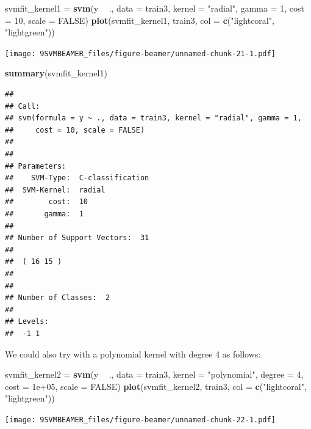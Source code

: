\documentclass[ignorenonframetext,]{beamer}
\newenvironment{Shaded}{\begin{snugshade}}{\end{snugshade}}
\newcommand{\KeywordTok}[1]{\textcolor[rgb]{0.13,0.29,0.53}{\textbf{#1}}}
\newcommand{\DataTypeTok}[1]{\textcolor[rgb]{0.13,0.29,0.53}{#1}}
\newcommand{\DecValTok}[1]{\textcolor[rgb]{0.00,0.00,0.81}{#1}}
\newcommand{\FloatTok}[1]{\textcolor[rgb]{0.00,0.00,0.81}{#1}}
\newcommand{\StringTok}[1]{\textcolor[rgb]{0.31,0.60,0.02}{#1}}
\newcommand{\OtherTok}[1]{\textcolor[rgb]{0.56,0.35,0.01}{#1}}
\newcommand{\OperatorTok}[1]{\textcolor[rgb]{0.81,0.36,0.00}{\textbf{#1}}}
\newcommand{\NormalTok}[1]{#1}
\begin{document}
\begin{frame}[fragile]

\begin{Shaded}
\begin{Highlighting}[]
\NormalTok{svmfit_kernel1 =}\StringTok{ }\KeywordTok{svm}\NormalTok{(y }\OperatorTok{~}\StringTok{ }\NormalTok{., }\DataTypeTok{data =}\NormalTok{ train3, }\DataTypeTok{kernel =} \StringTok{"radial"}\NormalTok{, }\DataTypeTok{gamma =} \DecValTok{1}\NormalTok{, }
    \DataTypeTok{cost =} \DecValTok{10}\NormalTok{, }\DataTypeTok{scale =} \OtherTok{FALSE}\NormalTok{)}
\KeywordTok{plot}\NormalTok{(svmfit_kernel1, train3, }\DataTypeTok{col =} \KeywordTok{c}\NormalTok{(}\StringTok{"lightcoral"}\NormalTok{, }\StringTok{"lightgreen"}\NormalTok{))}
\end{Highlighting}
\end{Shaded}

\texttt{[image: 9SVMBEAMER\_files/figure-beamer/unnamed-chunk-21-1.pdf]}

\begin{Shaded}
\begin{Highlighting}[]
\KeywordTok{summary}\NormalTok{(svmfit_kernel1)}
\end{Highlighting}
\end{Shaded}

\begin{verbatim}
## 
## Call:
## svm(formula = y ~ ., data = train3, kernel = "radial", gamma = 1, 
##     cost = 10, scale = FALSE)
## 
## 
## Parameters:
##    SVM-Type:  C-classification 
##  SVM-Kernel:  radial 
##        cost:  10 
##       gamma:  1 
## 
## Number of Support Vectors:  31
## 
##  ( 16 15 )
## 
## 
## Number of Classes:  2 
## 
## Levels: 
##  -1 1
\end{verbatim}

\normalsize

\end{frame}

\begin{frame}[fragile]

We could also try with a polynomial kernel with degree 4 as follows:

\footnotesize

\begin{Shaded}
\begin{Highlighting}[]
\NormalTok{svmfit_kernel2 =}\StringTok{ }\KeywordTok{svm}\NormalTok{(y }\OperatorTok{~}\StringTok{ }\NormalTok{., }\DataTypeTok{data =}\NormalTok{ train3, }\DataTypeTok{kernel =} \StringTok{"polynomial"}\NormalTok{, }\DataTypeTok{degree =} \DecValTok{4}\NormalTok{, }
    \DataTypeTok{cost =} \FloatTok{1e+05}\NormalTok{, }\DataTypeTok{scale =} \OtherTok{FALSE}\NormalTok{)}
\KeywordTok{plot}\NormalTok{(svmfit_kernel2, train3, }\DataTypeTok{col =} \KeywordTok{c}\NormalTok{(}\StringTok{"lightcoral"}\NormalTok{, }\StringTok{"lightgreen"}\NormalTok{))}
\end{Highlighting}
\end{Shaded}

\texttt{[image: 9SVMBEAMER\_files/figure-beamer/unnamed-chunk-22-1.pdf]}

\end{frame}
\end{document}
